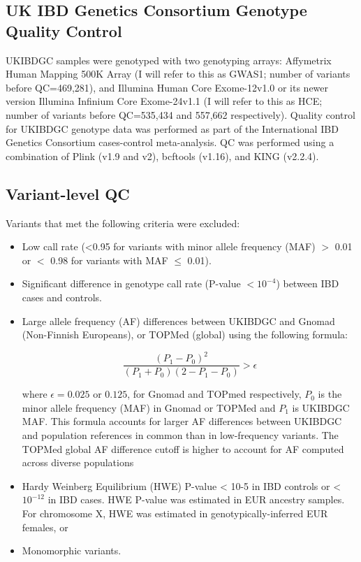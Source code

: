 \subsection{UK IBD Genetics Consortium Genotype Quality Control}
UKIBDGC samples were genotyped with two genotyping arrays: Affymetrix Human Mapping 500K Array (I will refer to this as GWAS1; number of variants before QC=469,281), and Illumina Human Core Exome-12v1.0 or its newer version Illumina Infinium Core Exome-24v1.1 (I will refer to this as HCE; number of variants before QC=535,434 and 557,662 respectively). Quality control for UKIBDGC genotype data was performed as part of the International IBD Genetics Consortium cases-control meta-analysis. QC was performed using a combination of Plink (v1.9 and v2), bcftools (v1.16), and KING (v2.2.4).
\subsection{Variant-level QC}
Variants that met the following criteria were excluded: 
\begin{itemize}
  \item Low call rate (<0.95 for variants with minor allele frequency (MAF) $>$ 0.01 or $<$ 0.98 for variants with MAF $\leq$ 0.01).
  \item Significant difference in genotype call rate (P-value $< 10^{-4}$) between IBD cases and controls.
  \item Large allele frequency (AF) differences between UKIBDGC and Gnomad (Non-Finnish Europeans), or TOPMed (global) using the following formula:

$$\frac{(P_{1}-P_{0})^{2}}{(P_{1}+P_{0})(2-P_{1}-P_{0})} > \epsilon$$ 


where $\epsilon=0.025$ or $0.125$, for Gnomad and TOPmed respectively,  $P_{0}$ is the minor allele frequency (MAF) in Gnomad or TOPMed and $P_{1}$ is UKIBDGC MAF. This formula accounts for larger AF differences between UKIBDGC and population references in common than in low-frequency variants. The TOPMed global AF difference cutoff is higher to account for AF computed across diverse populations
\item Hardy Weinberg Equilibrium (HWE) P-value < 10-5 in IBD controls or < $10^{-12}$ in IBD cases. HWE P-value was estimated in EUR ancestry samples. For chromosome X, HWE was estimated in genotypically-inferred EUR females, or 
\item Monomorphic variants. 
\end{itemize}

